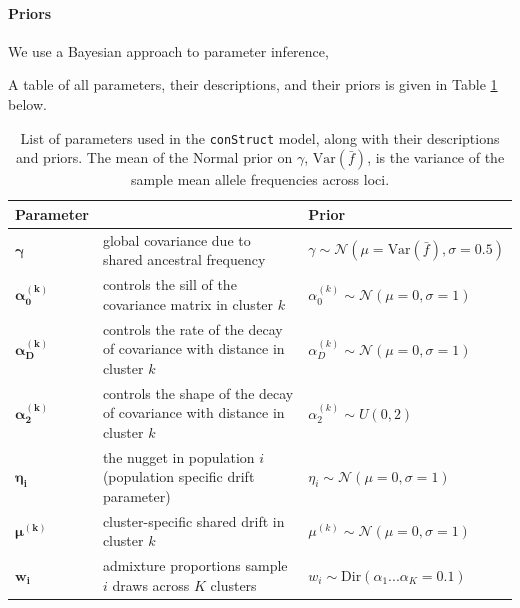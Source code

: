 \documentclass[12pt]{article}
\begin{document}
\paragraph{Priors}
We use a Bayesian approach to parameter inference, 

A table of all parameters, their descriptions, and their priors is given in Table \ref{tab:param_prior_tab} below.

\begin{centering}
\begin{table}
\begin{tabular}{| >{\centering\arraybackslash}m{2.1cm} | m{5.2cm} | >{\centering\arraybackslash}m{5.1cm} |}
	\hline
	\textbf{Parameter} & \centering{\textbf{Description}} & \textbf{Prior}\\ \hline
	$\boldsymbol{\gamma}$ & 
		global covariance due to shared ancestral frequency & 
		$\gamma \sim \mathcal{N}(\mu = \text{Var}(\bar{f}), \sigma = 0.5)$\\ \hline
	$\boldsymbol{\alpha^{(k)}_0}$ & 
		controls the sill of the covariance matrix in cluster $k$& 
		$\alpha^{(k)}_0 \sim \mathcal{N}(\mu = 0, \sigma = 1)$\\ \hline
	$\boldsymbol{\alpha^{(k)}_D}$ & 
		controls the rate of the decay of covariance with distance in cluster $k$& 
		$\alpha^{(k)}_D \sim \mathcal{N}(\mu = 0, \sigma = 1)$\\ \hline
	$\boldsymbol{\alpha^{(k)}_2}$ & 
		controls the shape of the decay of covariance with distance in cluster $k$ & 
		$\alpha^{(k)}_2 \sim U(0,2)$\\ \hline
	$\boldsymbol{\eta_i}$ & 
		the nugget in population $i$ (population specific drift parameter)  & 
		$\eta_i \sim \mathcal{N}(\mu = 0, \sigma = 1)$\\ \hline
	$\boldsymbol{\mu^{(k)}}$ & 
		cluster-specific shared drift in cluster $k$ &
		 $\mu^{(k)} \sim \mathcal{N}(\mu = 0, \sigma = 1)$\\ \hline
	$\boldsymbol{w_i}$ &
		admixture proportions sample $i$ draws across $K$ clusters &
		$w_i \sim \text{Dir}(\alpha_{1} ... \alpha_{K}=0.1)$  \\ \hline
	\hline
\end{tabular}
\caption{
List of parameters used in the \texttt{conStruct} model, along with their descriptions and priors.
The mean of the Normal prior on $\gamma$, $\text{Var}(\bar{f})$, is the variance of the sample mean allele frequencies across loci.
}\label{tab:param_prior_tab}
\end{table}
\end{centering}
\end{document}
